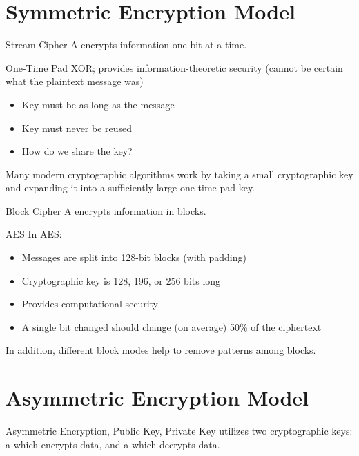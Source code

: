 \documentclass[12pt]{report}
\begin{document}
\section{Symmetric Encryption Model}
\begin{dfnbox}{Stream Cipher}{}
    A  encrypts information one bit at a time.
\end{dfnbox}

\begin{exbox}{One-Time Pad}{}
    XOR; provides information-theoretic security (cannot be certain what the plaintext message was)
    \begin{itemize}[noitemsep]
        \item Key must be as long as the message
        \item Key must never be reused
        \item How do we share the key?
   \end{itemize}
\end{exbox}

Many modern cryptographic algorithms work by taking a small cryptographic key and expanding it into a sufficiently large one-time pad key.

\begin{dfnbox}{Block Cipher}{}
    A  encrypts information in blocks.
\end{dfnbox}

\begin{exbox}{AES}{}
    In AES:
    \begin{itemize}[noitemsep]
        \item Messages are split into 128-bit blocks (with padding)
        \item Cryptographic key is 128, 196, or 256 bits long
        \item Provides computational security
        \item A single bit changed should change (on average) 50\% of the ciphertext
    \end{itemize}
    In addition, different block modes help to remove patterns among blocks.
\end{exbox}

\section{Asymmetric Encryption Model}

\begin{dfnbox}{Asymmetric Encryption, Public Key, Private Key}{}
     utilizes two cryptographic keys: a  which encrypts data, and a  which decrypts data.
\end{dfnbox}
\end{document}

